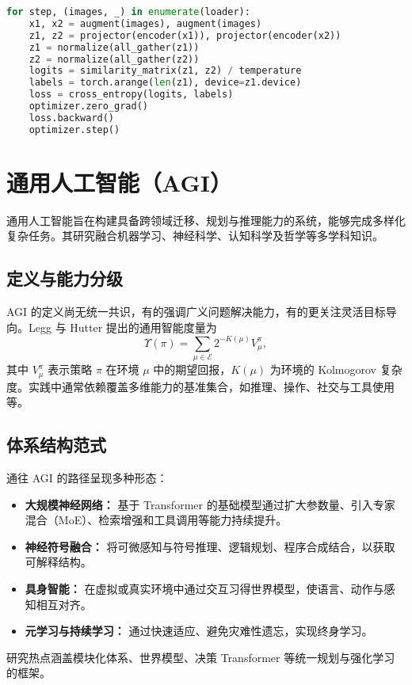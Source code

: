 \documentclass[UTF8,zihao=-4]{ctexart}
\begin{document}
\begin{lstlisting}[language=Python, caption={分布式对比学习（SimCLR）训练循环示例。}]
for step, (images, _) in enumerate(loader):
    x1, x2 = augment(images), augment(images)
    z1, z2 = projector(encoder(x1)), projector(encoder(x2))
    z1 = normalize(all_gather(z1))
    z2 = normalize(all_gather(z2))
    logits = similarity_matrix(z1, z2) / temperature
    labels = torch.arange(len(z1), device=z1.device)
    loss = cross_entropy(logits, labels)
    optimizer.zero_grad()
    loss.backward()
    optimizer.step()
\end{lstlisting}
\FloatBarrier

\section{通用人工智能（AGI）}
通用人工智能旨在构建具备跨领域迁移、规划与推理能力的系统，能够完成多样化复杂任务。其研究融合机器学习、神经科学、认知科学及哲学等多学科知识。

\subsection{定义与能力分级}
AGI 的定义尚无统一共识，有的强调广义问题解决能力，有的更关注灵活目标导向。Legg 与 Hutter 提出的通用智能度量为
\begin{equation}
  \Upsilon(\pi) = \sum_{\mu \in \mathcal{E}} 2^{-K(\mu)} V_\mu^\pi,
\end{equation}
其中 $V_\mu^\pi$ 表示策略 $\pi$ 在环境 $\mu$ 中的期望回报，$K(\mu)$ 为环境的 Kolmogorov 复杂度。实践中通常依赖覆盖多维能力的基准集合，如推理、操作、社交与工具使用等。

\subsection{体系结构范式}
通往 AGI 的路径呈现多种形态：
\begin{itemize}
  \item \textbf{大规模神经网络：} 基于 Transformer 的基础模型通过扩大参数量、引入专家混合（MoE）、检索增强和工具调用等能力持续提升。
  \item \textbf{神经符号融合：} 将可微感知与符号推理、逻辑规划、程序合成结合，以获取可解释结构。
  \item \textbf{具身智能：} 在虚拟或真实环境中通过交互习得世界模型，使语言、动作与感知相互对齐。
  \item \textbf{元学习与持续学习：} 通过快速适应、避免灾难性遗忘，实现终身学习。
\end{itemize}
研究热点涵盖模块化体系、世界模型、决策 Transformer 等统一规划与强化学习的框架。
\end{document}
